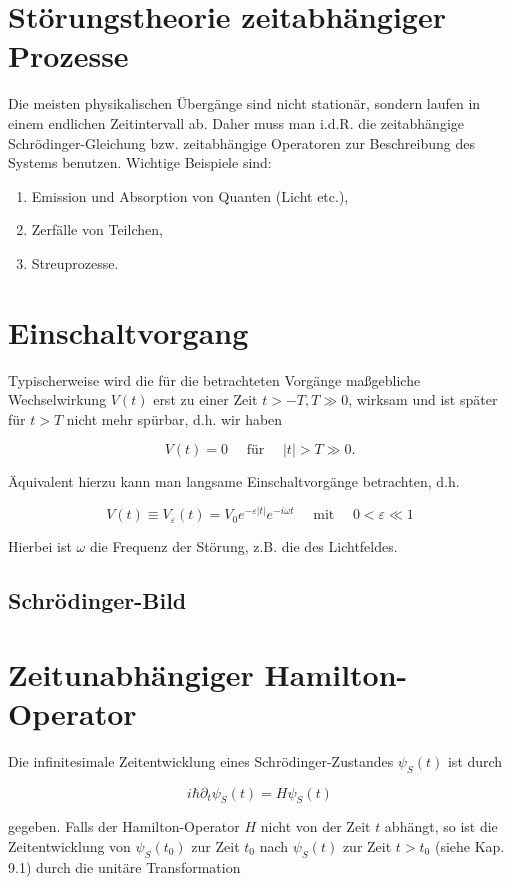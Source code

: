 \documentclass[10pt, letterpaper]{article}
\begin{document}
\pagebreak

\section{Störungstheorie zeitabhängiger Prozesse}


Die meisten physikalischen Übergänge sind nicht stationär, sondern laufen in einem endlichen Zeitintervall ab. Daher muss man i.d.R. die zeitabhängige Schrödinger-Gleichung bzw. zeitabhängige Operatoren zur Beschreibung des Systems benutzen. Wichtige Beispiele sind:

\begin{enumerate}
  \item Emission und Absorption von Quanten (Licht etc.),
  \item Zerfälle von Teilchen,
  \item Streuprozesse.
\end{enumerate}

\section*{Einschaltvorgang}
Typischerweise wird die für die betrachteten Vorgänge maßgebliche Wechselwirkung $V(t)$ erst zu einer Zeit $t>-T, T \gg 0$, wirksam und ist später für $t>T$ nicht mehr spürbar, d.h. wir haben

$$
V(t)=0 \quad \text { für } \quad|t|>T \gg 0 .
$$

Äquivalent hierzu kann man langsame Einschaltvorgänge betrachten, d.h.

$$
V(t) \equiv V_{\varepsilon}(t)=V_{0} e^{-\varepsilon|t|} e^{-i \omega t} \quad \text { mit } \quad 0<\varepsilon \ll 1
$$

Hierbei ist $\omega$ die Frequenz der Störung, z.B. die des Lichtfeldes.

\subsection*{Schrödinger-Bild}
\section*{Zeitunabhängiger Hamilton-Operator}
Die infinitesimale Zeitentwicklung eines Schrödinger-Zustandes $\psi_{S}(t)$ ist durch

$$
i \hbar \partial_{t} \psi_{S}(t)=H \psi_{S}(t)
$$

gegeben. Falls der Hamilton-Operator $H$ nicht von der Zeit $t$ abhängt, so ist die Zeitentwicklung von $\psi_{S}\left(t_{0}\right)$ zur Zeit $t_{0}$ nach $\psi_{S}(t)$ zur Zeit $t>t_{0}$ (siehe Kap. 9.1) durch die unitäre Transformation
\end{document}
